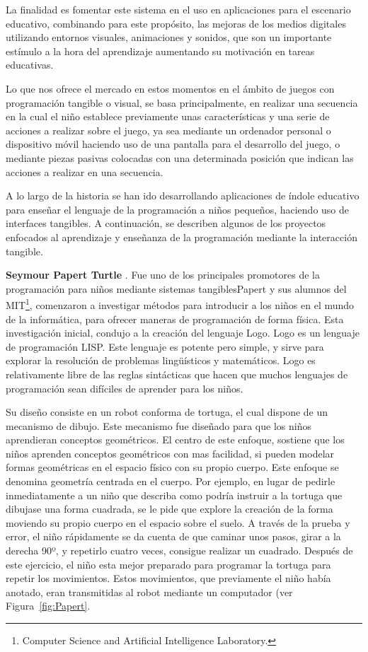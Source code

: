 La finalidad es fomentar este sistema en el uso en aplicaciones para el escenario educativo, combinando para este propósito, las mejoras de los medios digitales utilizando entornos visuales, animaciones y sonidos, que son un importante estímulo a la hora del aprendizaje aumentando su motivación en tareas educativas.

Lo que nos ofrece el mercado en estos momentos en el ámbito de juegos con programación tangible o visual, se basa principalmente, en realizar una secuencia en la cual el niño establece previamente unas características y una serie de acciones a realizar sobre el juego, ya sea mediante un ordenador personal o dispositivo móvil haciendo uso de una pantalla para el desarrollo del juego, o mediante piezas pasivas colocadas con una determinada posición que indican las acciones a realizar en una secuencia.

A lo largo de la historia se han ido desarrollando aplicaciones de índole educativo para enseñar el lenguaje de la programación a niños pequeños, haciendo uso de interfaces tangibles. A continuación, se describen algunos de los proyectos enfocados al aprendizaje y enseñanza de la programación mediante la interacción tangible.

\textbf{Seymour Papert Turtle} \cite{Papert}. Fue uno de los principales promotores de la programación para niños mediante sistemas tangiblesPapert y sus alumnos del MIT\footnote{Computer Science and Artificial Intelligence Laboratory.}, comenzaron a investigar métodos para introducir a los niños en el mundo de la informática, para ofrecer maneras de programación de forma física. Esta investigación inicial, condujo a la creación del lenguaje Logo. Logo es un lenguaje de programación LISP. Este lenguaje es potente pero simple, y sirve para explorar la resolución de problemas lingüísticos y matemáticos. Logo es relativamente libre de las reglas sintácticas que hacen que muchos lenguajes de programación sean difíciles de aprender para los niños.

Su diseño consiste en un robot conforma de tortuga, el cual dispone de un mecanismo de dibujo. Este mecanismo fue diseñado para que los niños aprendieran conceptos geométricos. 
El centro de este enfoque, sostiene que los niños aprenden conceptos geométricos con mas facilidad, si pueden modelar formas geométricas en el espacio físico con su propio cuerpo. Este enfoque se denomina geometría centrada en el cuerpo. Por ejemplo, en lugar de pedirle inmediatamente a un niño que describa como podría instruir a la tortuga que dibujase una forma cuadrada, se le pide que explore la creación de la forma moviendo su propio cuerpo en el espacio sobre el suelo. A través de la prueba y error, el niño rápidamente se da cuenta de que caminar unos pasos, girar a la derecha 90º, y repetirlo cuatro veces, consigue realizar un cuadrado. Después de este ejercicio, el niño esta mejor preparado para programar la tortuga para repetir los movimientos. Estos movimientos, que previamente el niño había anotado, eran transmitidas al robot mediante un computador (ver Figura~\ref{fig:Papert}.

